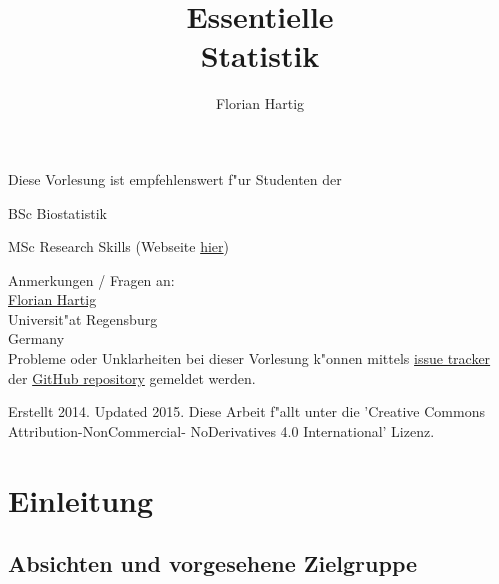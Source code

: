 \documentclass[a4paper,twoside]{tufte-book}\usepackage[]{graphicx}\usepackage[]{color}
\title{Essentielle\\Statistik}
\author{Florian Hartig}
\begin{document}

\let\cleardoublepage\clearpage %
\maketitle


\thispagestyle{empty}
\null

\begin{fullwidth}
Diese Vorlesung ist empfehlenswert f"ur Studenten der

\begin{itemize*}
  \item BSc Biostatistik
  \item MSc Research Skills (Webseite \href{http://florianhartig.github.io/ResearchSkills/}{hier})
\end{itemize*}

\vspace{0.5cm}

Anmerkungen / Fragen an:\\[0.5cm]
\href{https://florianhartig.wordpress.com/}{Florian Hartig}\\
Universit"at Regensburg\\
Germany\\[0.5cm]

Probleme oder Unklarheiten bei dieser Vorlesung k"onnen mittels \href{https://github.com/florianhartig/Statistics/issues}{issue tracker} der \href{https://github.com/florianhartig/Statistics/tree/master/EssentialStatistics}{GitHub repository} gemeldet werden. 

\end{fullwidth}


\vfill
\begin{fullwidth}
Erstellt 2014. Updated 2015. Diese Arbeit f"allt unter die 'Creative Commons Attribution-NonCommercial- NoDerivatives 4.0 International' Lizenz.
\end{fullwidth}


\newpage
\tableofcontents

\chapter{Einleitung} %

	\section{Absichten und vorgesehene Zielgruppe}
	
\end{document}
